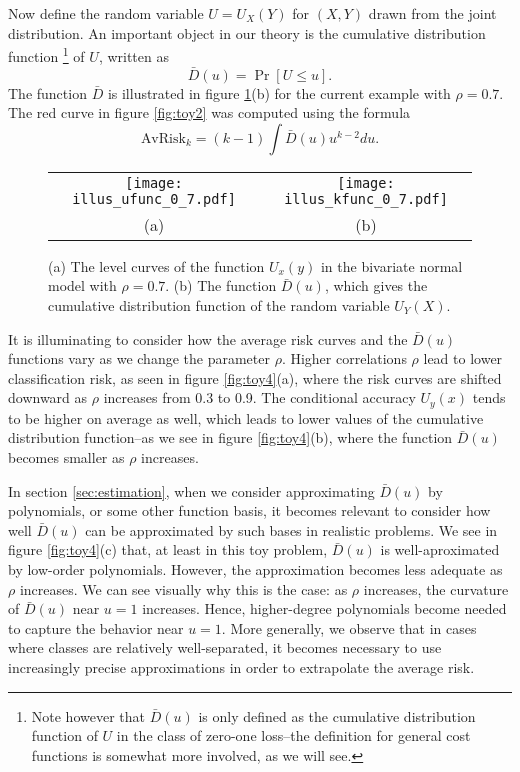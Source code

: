 \documentclass[12pt]{article}
\begin{document}
Now define the random variable $U = U_X(Y)$ for $(X, Y)$ drawn from
the joint distribution.  An important object in our theory is the
cumulative distribution function
\footnote{Note however that $\bar{D}(u)$ is only defined as the cumulative
distribution function of $U$ in the class of zero-one loss--the
definition for general cost functions is somewhat more involved, as we
will see.}
of $U$, written as
\[
\bar{D}(u) = \Pr[U \leq u].
\]
The function $\bar{D}$ is illustrated in
figure \ref{fig:toy3}(b) for the current example with $\rho = 0.7$.
The red curve in figure \ref{fig:toy2} was computed using the formula
\[
\text{AvRisk}_k = (k-1) \int \bar{D}(u) u^{k-2} du.
\]

\begin{figure}[h]
\centering
\begin{tabular}{cc}
\texttt{[image: illus\_ufunc\_0\_7.pdf]} &
\texttt{[image: illus\_kfunc\_0\_7.pdf]}\\
(a) & (b)
\end{tabular}

\caption{
(a) The level curves of the function $U_x(y)$ in the bivariate normal model with $\rho = 0.7$.
(b) The function $\bar{D}(u)$, which gives the cumulative distribution function of the random variable $U_Y(X)$.}\label{fig:toy3}
\end{figure}

It is illuminating to consider how the average risk curves and the
$\bar{D}(u)$ functions vary as we change the parameter $\rho$.  Higher
correlations $\rho$ lead to lower classification risk, as seen in
figure \ref{fig:toy4}(a), where the risk curves are shifted downward as
$\rho$ increases from 0.3 to 0.9.  The conditional accuracy $U_y(x)$
tends to be higher on average as well, which leads to lower values of
the cumulative distribution function--as we see in
figure \ref{fig:toy4}(b), where the function $\bar{D}(u)$ becomes smaller
as $\rho$ increases.

In section \ref{sec:estimation}, when we consider approximating
$\bar{D}(u)$ by polynomials, or some other function basis, it becomes
relevant to consider how well $\bar{D}(u)$ can be approximated by such
bases in realistic problems.  We see in figure \ref{fig:toy4}(c) that,
at least in this toy problem, $\bar{D}(u)$ is well-aproximated by
low-order polynomials.  However, the approximation becomes less
adequate as $\rho$ increases.  We can see visually why this is the
case: as $\rho$ increases, the curvature of $\bar{D}(u)$ near $u = 1$
increases.  Hence, higher-degree polynomials become needed to capture
the behavior near $u = 1$.  More generally, we observe that in cases
where classes are relatively well-separated, it becomes necessary to
use increasingly precise approximations in order to extrapolate the
average risk.
\end{document}
